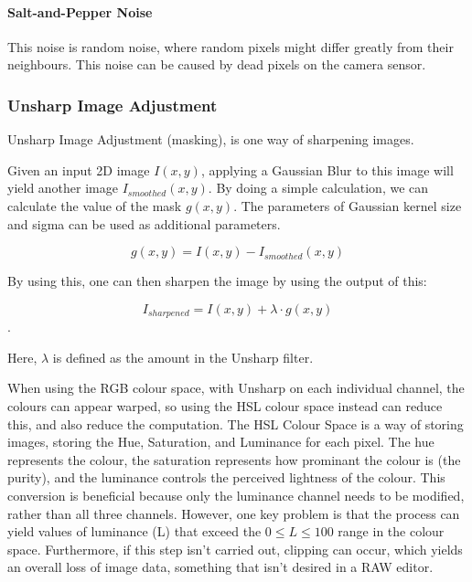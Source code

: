 \documentclass[10pt,a4paper]{article}
\begin{document}
\paragraph{Salt-and-Pepper Noise}
    This noise is random noise, where random pixels might differ greatly from their neighbours. This noise can be caused
    by dead pixels on the camera sensor. \cite{NRandFiltering}
    



\subsubsection{Unsharp Image Adjustment}
    Unsharp Image Adjustment (masking), is one way of sharpening images.

    Given an input 2D image $I(x, y)$, applying a Gaussian Blur to this image will yield another image $I_{smoothed}(x, y)$.
    By doing a simple calculation, we can calculate the value of the mask $g(x, y)$. The parameters of Gaussian kernel size and 
    sigma can be used as additional parameters.

    $$g(x, y) = I(x, y) -  I_{smoothed}(x, y)$$

    By using this, one can then sharpen the image by using the output of this:

    $$I_{sharpened} = I(x, y) + \lambda \cdot g(x, y)$$.

    Here, $\lambda$ is defined as the amount in the Unsharp filter.
    
    \cite{Unsharp}

    When using the RGB colour space, with Unsharp on each individual channel, the colours can appear warped, so using the HSL colour space instead
    can reduce this, and also reduce the computation. The HSL Colour Space is a way of storing images, storing the Hue, Saturation, and Luminance
    for each pixel. The hue represents the colour, the saturation represents how prominant the colour is (the purity), and the luminance controls 
    the perceived lightness of the colour. This conversion is beneficial because only the luminance channel needs to be modified, rather than all three channels.
    However, one key problem is that the process can yield values of luminance (L) that exceed the $0 \le L \le 100$ range in the colour space.
    Furthermore, if this step isn't carried out, clipping can occur, which yields an overall loss of image data, something that isn't desired in a RAW editor.
\end{document}
